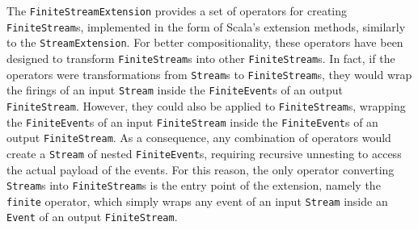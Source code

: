 The \texttt{FiniteStreamExtension} provides a set of operators for creating
\texttt{Finite\-Stream}s, implemented in the form of Scala's extension methods,
similarly to the \texttt{StreamExten\-sion}. For better compositionality, these
operators have been designed to transform \texttt{FiniteStream}s into other
\texttt{FiniteStream}s. In fact, if the operators were transformations from
\texttt{Stream}s to \texttt{FiniteStream}s, they would wrap the firings of an
input \texttt{Stream} inside the \texttt{FiniteEvent}s of an output
\texttt{FiniteStream}. However, they could also be applied to
\texttt{FiniteStream}s, wrapping the \texttt{Finite\-Event}s of an input
\texttt{FiniteStream} inside the \texttt{FiniteEvent}s of an output
\texttt{Finite\-Stream}. As a consequence, any combination of operators would
create a \texttt{Stream} of nested \texttt{FiniteEvent}s, requiring recursive
unnesting to access the actual payload of the events. For this reason, the only
operator converting \texttt{Stream}s into \texttt{FiniteStream}s is the entry
point of the extension, namely the \texttt{finite} operator, which simply wraps
any event of an input \texttt{Stream} inside an \texttt{Event} of an output
\texttt{FiniteStream}.

